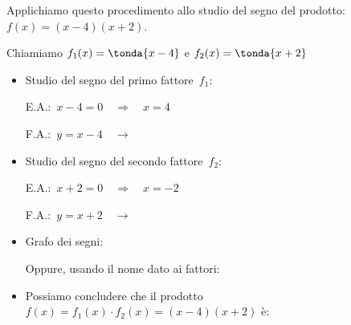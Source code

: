 \begin{esempio}
Applichiamo questo procedimento allo studio del segno del 
prodotto: \\
\(f(x)=(x-4)(x+2)\).

Chiamiamo \(f_1(x)=\tonda{x-4}\) \quad e \quad \(f_2(x)=\tonda{x+2}\)

\begin{itemize} [noitemsep]
 \item Studio del segno del primo fattore~\(f_1\):\\
 \begin{minipage}{.45\textwidth}
  E.A.:~\(x - 4 = 0 \quad \Rightarrow \quad x = 4\)
 \end{minipage}
 \begin{minipage}{.25\textwidth}
  F.A.:~\(y = x - 4 \quad \rightarrow\)
 \end{minipage}
 \begin{minipage}{.3\textwidth}
%   
 \end{minipage}
 \item Studio del segno del secondo fattore~\(f_2\):\\
 \begin{minipage}{.45\textwidth}
  E.A.:~\(x + 2 = 0 \quad \Rightarrow \quad x=-2\)
 \end{minipage}
 \begin{minipage}{.25\textwidth}
  F.A.:~\(y = x + 2 \quad \rightarrow\)
 \end{minipage}
 \begin{minipage}{.3\textwidth}
%   
 \end{minipage}
 \item Grafo dei segni:
 
 \segnoprodottoa
 
 Oppure, usando il nome dato ai fattori: 
 
 \segnoprodottoas
 \item Possiamo concludere che il prodotto 
 \(f(x) = f_1(x) \cdot f_2(x)=(x -4)(x +2)\) è:
\end{itemize}
\end{esempio}

